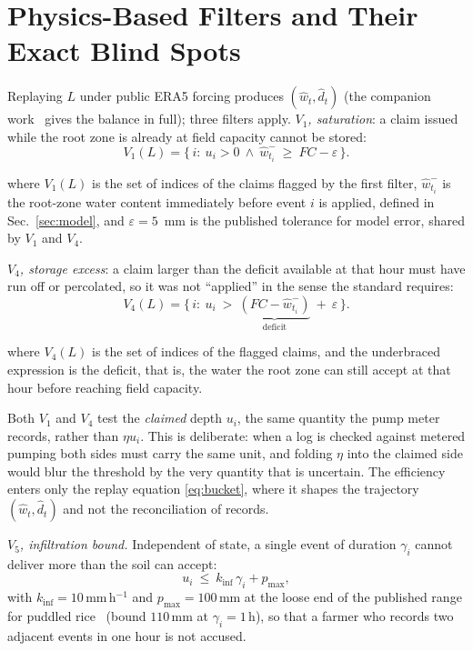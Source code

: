 \section{Physics-Based Filters and Their Exact Blind Spots}
\label{sec:filters}

Replaying $L$ under public ERA5 forcing produces $(\hat w_t,\hat d_t)$ (the
companion work~\cite{twingate2026} gives the balance in full); three filters
apply. \emph{$V_1$, saturation}: a claim issued while the root zone is already
at field capacity cannot be stored:
\begin{equation}
V_1(L)=\{\,i:\ u_i>0\ \wedge\ \hat w_{t_i}^{-}\ \ge\ FC-\varepsilon\,\}.
\label{eq:v1}
\end{equation}

where $V_1(L)$ is the set of indices of the claims flagged by the first filter,
$\hat w_{t_i}^{-}$ is the root-zone water content immediately before event $i$ is
applied, defined in Sec.~\ref{sec:model}, and $\varepsilon=5$~mm is the published
tolerance for model error, shared by $V_1$ and $V_4$.

\emph{$V_4$, storage excess}: a claim larger than the deficit available at
that hour must have run off or percolated, so it was not ``applied'' in the
sense the standard requires:
\begin{equation}
V_4(L)=\{\,i:\ u_i\ >\ \underbrace{(FC-\hat w_{t_i}^{-})}_{\text{deficit}}
\ +\ \varepsilon\,\}.
\label{eq:v4}
\end{equation}

where $V_4(L)$ is the set of indices of the flagged claims, and the underbraced
expression is the deficit, that is, the water the root zone can still accept at that
hour before reaching field capacity.

Both $V_1$ and $V_4$ test the \emph{claimed} depth $u_i$, the same quantity the pump
meter records, rather than $\eta u_i$. This is deliberate: when a log is checked
against metered pumping both sides must carry the same unit, and folding $\eta$ into
the claimed side would blur the threshold by the very quantity that is uncertain.
The efficiency enters only the replay equation \eqref{eq:bucket}, where it shapes
the trajectory $(\hat w_t,\hat d_t)$ and not the reconciliation of records.

\emph{$V_5$, infiltration bound.} Independent of state, a single event of
duration $\gamma_i$ cannot deliver more than the soil can accept:
\begin{equation}
u_i\ \le\ k_{\mathrm{inf}}\,\gamma_i+p_{\max},
\label{eq:v5}
\end{equation}
with $k_{\mathrm{inf}}=10$\,mm\,h$^{-1}$ and $p_{\max}=100$\,mm at the
loose end of the published range for puddled rice~\cite{kukal2004,bouman2001}
(bound $110$\,mm at $\gamma_i=1$\,h), so that a farmer who records two adjacent
events in one hour is not accused.


